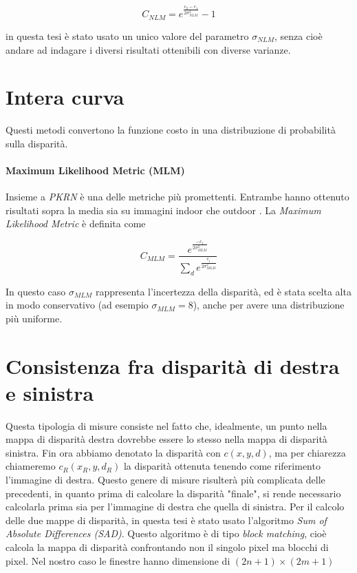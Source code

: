 \documentclass[12pt]{report}
\begin{document}
				\begin{equation}
					C_{NLM}= e^{ \frac{ c_{2}-c_{1}} {2\sigma_{NLM}^2}}-1
					\label{eq:NLM}
				\end{equation}
				
				\noindent in questa tesi è stato usato un unico valore del parametro $\sigma_{NLM}$, senza cioè andare ad indagare i diversi risultati ottenibili con diverse varianze.
				
		\section{Intera curva}
		\label{sec:entireCost}
		
			Questi metodi convertono la funzione costo in una distribuzione di probabilità sulla disparità.
			
			\paragraph{Maximum Likelihood Metric (MLM)}
			\label{par:MLM}
			
				Insieme a \textit{PKRN} è una delle metriche più promettenti. Entrambe hanno ottenuto risultati sopra la media sia su immagini indoor che outdoor \cite{indoors_outdoors}.
				La \textit{Maximum Likelihood Metric} è definita come
				
				\begin{equation}
					C_{MLM}= \frac{e^\frac{-c_{1}}{2\sigma_{MLM}^2}}{\sum_{d} e^\frac{c_{i}}{2\sigma_{MLM}^2}}
					\label{eq:MLM}
				\end{equation}  	
			
				\noindent In questo caso $\sigma_{MLM}$ rappresenta l'incertezza della disparità, ed è stata scelta alta in modo conservativo (ad esempio $\sigma_{MLM}=8$), anche per avere una distribuzione più uniforme.
		
				
		\section{Consistenza fra disparità di destra e sinistra}
		\label{sec:leftRight}
			
			Questa tipologia di misure consiste nel fatto che, idealmente, un punto nella mappa di disparità destra dovrebbe essere lo stesso nella mappa di disparità sinistra. Fin ora abbiamo denotato la disparità con $c(x,y,d)$, ma per chiarezza chiameremo $c_{R}(x_{R},y,d_{R})$ la disparità ottenuta tenendo come riferimento l'immagine di destra. Questo genere di misure risulterà più complicata delle precedenti, in quanto prima di calcolare la disparità "finale", si rende necessario calcolarla prima sia per l'immagine di destra che quella di sinistra. Per il calcolo delle due mappe di disparità, in questa tesi è stato usato l'algoritmo \textit{Sum of Absolute Differences (SAD)}. Questo algoritmo è di tipo \textit{block matching}, cioè calcola la mappa di disparità confrontando non il singolo pixel ma blocchi di pixel. Nel nostro caso le finestre hanno dimensione di $(2n+1)\times(2m+1)$
		
\end{document}
